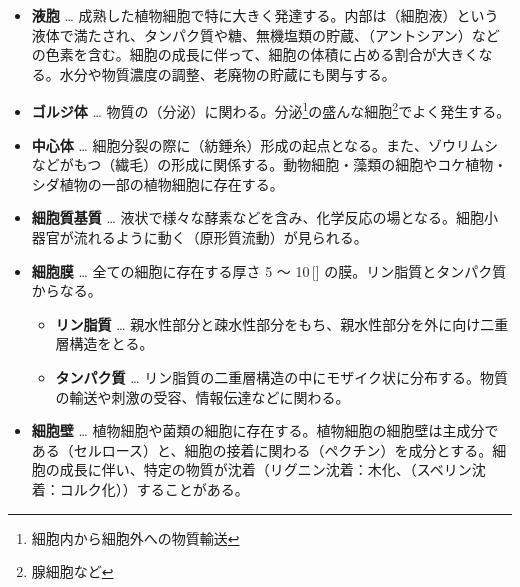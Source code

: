 \begin{figure}[H]\centering{}\end{figure}
\begin{itemize}\setlength{\leftskip}{-1.00zw}%
\item[\ajMaru{5}] \textbf{液胞} … 成熟した植物細胞で特に大きく発達する。内部は（\textcolor{black!10}{細胞液}）という液体で満たされ、タンパク質や糖、無機塩類の貯蔵、（\textcolor{black!10}{アントシアン}）などの色素を含む。細胞の成長に伴って、細胞の体積に占める割合が大きくなる。水分や物質濃度の調整、老廃物の貯蔵にも関与する。
\item[\ajMaru{6}] \textbf{ゴルジ体} … 物質の（\textcolor{black!10}{分泌}）に関わる。分泌\footnote{細胞内から細胞外への物質輸送}の盛んな細胞\footnote{腺細胞など}でよく発生する。
\item[\ajMaru{7}] \textbf{中心体} … 細胞分裂の際に（\textcolor{black!10}{紡錘糸}）形成の起点となる。また、ゾウリムシなどがもつ（\textcolor{black!10}{繊毛}）の形成に関係する。動物細胞・藻類の細胞やコケ植物・シダ植物の一部の植物細胞に存在する。
\item[\ajMaru{8}] \textbf{細胞質基質} … 液状で様々な酵素などを含み、化学反応の場となる。細胞小器官が流れるように動く（\textcolor{black!10}{原形質流動}）が見られる。
\item[\ajMaru{9}] \textbf{細胞膜} … 全ての細胞に存在する厚さ 5 ～ 10\,[] の膜。リン脂質とタンパク質からなる。
  \begin{itemize}\setlength{\leftskip}{-1.00zw}%
  \item[(1)] \textbf{リン脂質} … 親水性部分と疎水性部分をもち、親水性部分を外に向け二重層構造をとる。
  \item[(2)] \textbf{タンパク質} … リン脂質の二重層構造の中にモザイク状に分布する。物質の輸送や刺激の受容、情報伝達などに関わる。
  \end{itemize}
\item[\ajMaru{10}] \textbf{細胞壁} … 植物細胞や菌類の細胞に存在する。植物細胞の細胞壁は主成分である（\textcolor{black!10}{セルロース}）と、細胞の接着に関わる（\textcolor{black!10}{ペクチン}）を成分とする。細胞の成長に伴い、特定の物質が沈着（\textcolor{black!10}{リグニン沈着}：木化、（\textcolor{black!10}{スベリン沈着}：コルク化））することがある。
\end{itemize}
